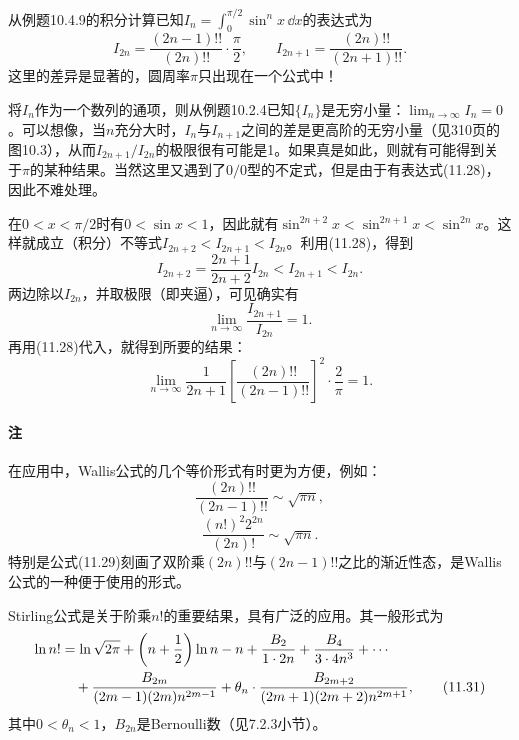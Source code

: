 从例题10.4.9的积分计算已知$I_n=\int_0^{\pi/2}\sin^nx\,\dd x$的表达式为
\begin{equation}
  I_{2n}=\frac{(2n-1)!!}{(2n)!!}\cdot\frac\pi2,
  \qquad
  I_{2n+1}=\frac{(2n)!!}{(2n+1)!!}.
  \tag{11.28}
  \label{eq:11.28}
\end{equation}
这里的差异是显著的，圆周率$\pi$只出现在一个公式中！

将$I_n$作为一个数列的通项，则从例题10.2.4已知$\{I_n\}$是无穷小量：$\lim_{n\to\infty}I_n=0$。可以想像，当$n$充分大时，$I_n$与$I_{n+1}$之间的差是更高阶的无穷小量（见310页的图10.3），从而$I_{2n+1}/I_{2n}$的极限很有可能是1。如果真是如此，则就有可能得到关于$\pi$的某种结果。当然这里又遇到了$0/0$型的不定式，但是由于有表达式(11.28)，因此不难处理。

\begin{xproof}
在$0<x<\pi/2$时有$0<\sin x<1$，因此就有$\sin^{2n+2}x<\sin^{2n+1}x<\sin^{2n}x$。这样就成立（积分）不等式$I_{2n+2}<I_{2n+1}<I_{2n}$。利用(11.28)，得到
\[
  I_{2n+2}=\frac{2n+1}{2n+2}I_{2n}<I_{2n+1}<I_{2n}.
\]
两边除以$I_{2n}$，并取极限（即夹逼），可见确实有
\[
  \lim_{n\to\infty}\frac{I_{2n+1}}{I_{2n}}=1.
\]
再用(11.28)代入，就得到所要的结果：
\[
  \lim_{n\to\infty}\frac1{2n+1}
  \left[\frac{(2n)!!}{(2n-1)!!}\right]^2\cdot\frac2\pi=1.
\]
\end{xproof}

\paragraph{注} 在应用中，Wallis公式的几个等价形式有时更为方便，例如：
\begin{equation}
  \frac{(2n)!!}{(2n-1)!!}\sim\sqrt{\pi n},
  \tag{11.29}
  \label{eq:11.29}
\end{equation}
\begin{equation}
  \frac{(n!)^2 2^{2n}}{(2n)!}\sim\sqrt{\pi n}.
  \tag{11.30}
  \label{eq:11.30}
\end{equation}
特别是公式(11.29)刻画了双阶乘$(2n)!!$与$(2n-1)!!$之比的渐近性态，是Wallis公式的一种便于使用的形式。

Stirling公式是关于阶乘$n!$的重要结果，具有广泛的应用。其一般形式为
\begin{align}
\ln n!&=\ln\sqrt{2\pi}+\left(n+\frac12\right)\ln n-n
+\frac{B_2}{1\cdot2n}+\frac{B_4}{3\cdot4n^3}+\cdots\notag\\
&\quad+\frac{B_{2m}}{(2m-1)(2m)n^{2m-1}}
+\theta_n\cdot\frac{B_{2m+2}}{(2m+1)(2m+2)n^{2m+1}},
\tag{11.31}
\label{eq:11.31}
\end{align}
其中$0<\theta_n<1$，$B_{2n}$是Bernoulli数（见7.2.3小节）。

